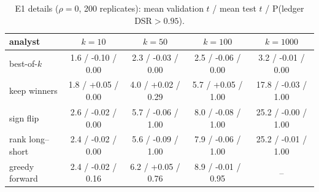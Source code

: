 \begin{table}[h]\centering\small
\caption{E1 details ($\rho=0$, 200 replicates): mean validation $t$ / mean test $t$ / P(ledger DSR$>0.95$).}\label{tab:e1}
\begin{tabular}{lcccc}\toprule
analyst & $k=10$ & $k=50$ & $k=100$ & $k=1000$\\\midrule
best-of-$k$ & 1.6 / -0.10 / 0.00 & 2.3 / -0.03 / 0.00 & 2.5 / -0.06 / 0.00 & 3.2 / -0.01 / 0.00\\
keep winners & 1.8 / +0.05 / 0.00 & 4.0 / +0.02 / 0.29 & 5.7 / +0.05 / 1.00 & 17.8 / -0.03 / 1.00\\
sign flip & 2.6 / -0.02 / 0.00 & 5.7 / -0.06 / 1.00 & 8.0 / -0.08 / 1.00 & 25.2 / -0.00 / 1.00\\
rank long--short & 2.4 / -0.02 / 0.00 & 5.6 / -0.09 / 1.00 & 7.9 / -0.06 / 1.00 & 25.2 / -0.01 / 1.00\\
greedy forward & 2.4 / -0.02 / 0.16 & 6.2 / +0.05 / 0.76 & 8.9 / -0.01 / 0.95 & --\\
\bottomrule\end{tabular}\end{table}
